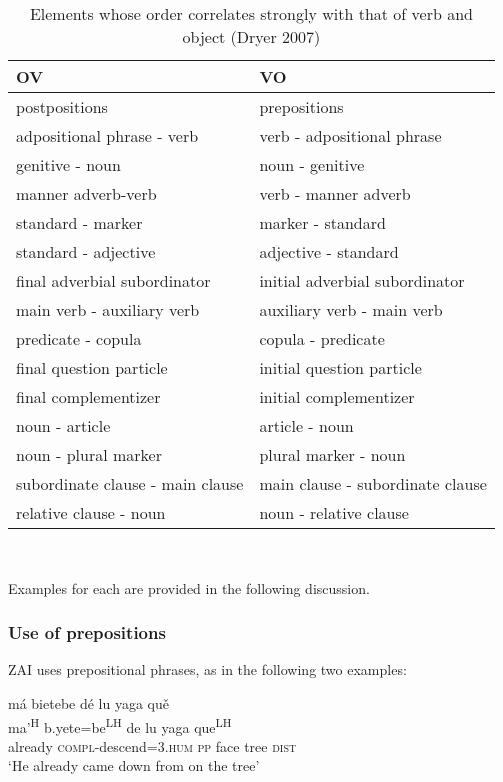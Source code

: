 \singlespacing
\begin{table}[H]
\begin{center}
\caption{\small{Elements whose order correlates strongly with that of verb and object (Dryer 2007)}}
\begin{tabular}{| l | l |}\hline
   OV & VO  \\
\hline
 postpositions & prepositions \\
\hline
 adpositional phrase - verb & verb - adpositional phrase \\
\hline
 genitive - noun & noun - genitive \\
\hline
 manner adverb-verb & verb - manner adverb \\
\hline
 standard - marker & marker - standard \\
\hline
 standard - adjective & adjective - standard \\
\hline
 final adverbial subordinator & initial adverbial subordinator \\
\hline
 main verb - auxiliary verb & auxiliary verb - main verb \\
\hline
 predicate - copula & copula - predicate \\
\hline
 final question particle & initial question particle \\
\hline
 final complementizer & initial complementizer \\
\hline
 noun - article & article - noun \\
 \hline
 noun - plural marker & plural marker - noun \\
\hline
 subordinate clause - main clause & main clause - subordinate clause \\
\hline
 relative clause - noun & noun - relative clause \\
\hline
\end{tabular}\\
\label{ovvo}
\end{center}
\end{table}


Examples for each are provided in the following discussion.


\subsubsection{Use of prepositions}

ZAI uses prepositional phrases, as in the following two examples:

\ea\label{prep1}
\glll m\'{a} bietebe d\'{e} lu yaga qu\v{e} \\
ma'\textsuperscript{H} b.yete=be\textsuperscript{LH} de lu yaga que\textsuperscript{LH} \\
already \textsc{compl}-descend=\textsc{3.hum} \textsc{pp} face tree \textsc{dist} \\
\glt `He already came down from on the tree' 
\z

